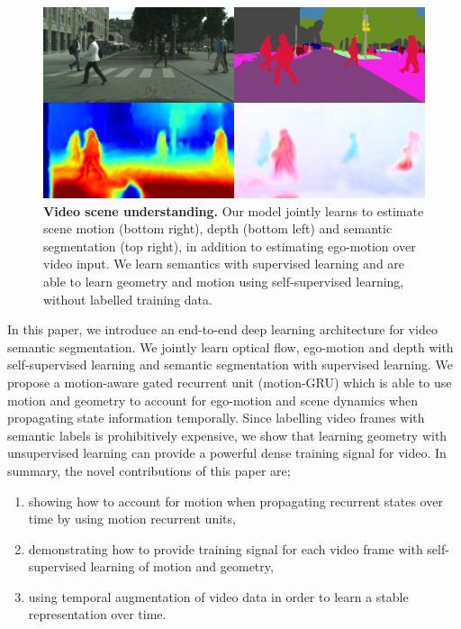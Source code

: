 \begin{figure}[t]
\begin{center}
\includegraphics[width=0.7\columnwidth,trim={7mm 12mm 7mm 5mm},clip]{videosegnet.png}
\end{center}
   \vspace{-5mm}
   \caption[Video scene understanding.]{\textbf{Video scene understanding.} Our model jointly learns to estimate scene motion (bottom right), depth (bottom left) and semantic segmentation (top right), in addition to estimating ego-motion over video input. We learn semantics with supervised learning and are able to learn geometry and motion using self-supervised learning, without labelled training data.} %
\label{fig:teaser}
   \vspace{-5mm}
\end{figure}

In this paper, we introduce an end-to-end deep learning architecture for video semantic segmentation. We jointly learn optical flow, ego-motion and depth with self-supervised learning and semantic segmentation with supervised learning. We propose a motion-aware gated recurrent unit (motion-GRU) which is able to use motion and geometry to account for ego-motion and scene dynamics when propagating state information temporally. Since labelling video frames with semantic labels is prohibitively expensive, we show that learning geometry with unsupervised learning can provide a powerful dense training signal for video. In summary, the novel contributions of this paper are;
\begin{enumerate}%
\item showing how to account for motion when propagating recurrent states over time by using motion recurrent units,
\item demonstrating how to provide training signal for each video frame with self-supervised learning of motion and geometry,
\item using temporal augmentation of video data in order to learn a stable representation over time.
\end{enumerate}

